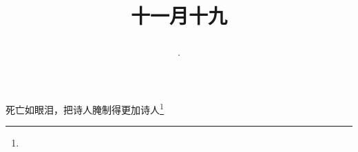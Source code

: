 \title{\date[d=19,m=12,y=2024][year:cn-y,年,month:cn,day:cn,日,·,weekday]·十一月十九 }
死亡如眼泪，把诗人腌制得更加诗人\footnote{ }

